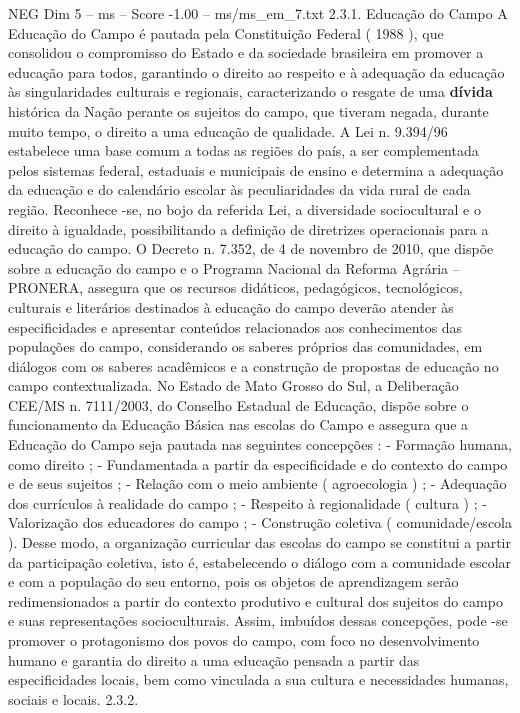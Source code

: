 \begin{textsample}{NEG Dim 5 – ms – Score -1.00 – ms/ms\_em\_7.txt}  \label{ex:f5_neg_073}
2.3.1.
Educação do Campo A Educação do Campo é pautada pela Constituição Federal ( 1988 ), que consolidou o compromisso do Estado e da sociedade brasileira em promover a educação para todos, garantindo o direito ao respeito e à adequação da educação às singularidades culturais e regionais, caracterizando o resgate de uma \textbf{dívida} histórica da Nação perante os sujeitos do campo, que tiveram negada, durante muito tempo, o direito a uma educação de qualidade.
A Lei n. 9.394/96 estabelece uma base comum a todas as regiões do país, a ser complementada pelos sistemas federal, estaduais e municipais de ensino e determina a adequação da educação e do calendário escolar às peculiaridades da vida rural de cada região.
Reconhece -se, no bojo da referida Lei, a diversidade sociocultural e o direito à igualdade, possibilitando a definição de diretrizes operacionais para a educação do campo.
O Decreto n. 7.352, de 4 de novembro de 2010, que dispõe sobre a educação do campo e o Programa Nacional da Reforma Agrária – PRONERA, assegura que os recursos didáticos, pedagógicos, tecnológicos, culturais e literários destinados à educação do campo deverão atender às especificidades e apresentar conteúdos relacionados aos conhecimentos das populações do campo, considerando os saberes próprios das comunidades, em diálogos com os saberes acadêmicos e a construção de propostas de educação no campo contextualizada.
No Estado de Mato Grosso do Sul, a Deliberação CEE/MS n. 7111/2003, do Conselho Estadual de Educação, dispõe sobre o funcionamento da Educação Básica nas escolas do Campo e assegura que a Educação do Campo seja pautada nas seguintes concepções : - Formação humana, como direito ; - Fundamentada a partir da especificidade e do contexto do campo e de seus sujeitos ; - Relação com o meio ambiente ( agroecologia ) ; - Adequação dos currículos à realidade do campo ; - Respeito à regionalidade ( cultura ) ; - Valorização dos educadores do campo ; - Construção coletiva ( comunidade/escola ).
Desse modo, a organização curricular das escolas do campo se constitui a partir da participação coletiva, isto é, estabelecendo o diálogo com a comunidade escolar e com a população do seu entorno, pois os objetos de aprendizagem serão redimensionados a partir do contexto produtivo e cultural dos sujeitos do campo e suas representações socioculturais.
Assim, imbuídos dessas concepções, pode -se promover o protagonismo dos povos do campo, com foco no desenvolvimento humano e garantia do direito a uma educação pensada a partir das especificidades locais, bem como vinculada a sua cultura e necessidades humanas, sociais e locais. 2.3.2.

\end{textsample}

